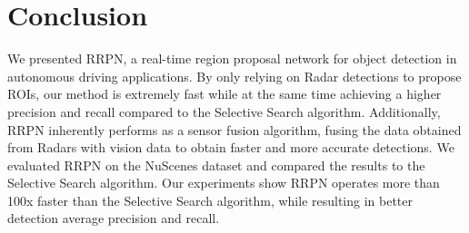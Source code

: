 \documentclass{article}
\newcommand{\dataset}{NuScenes }
\begin{document}
\section{Conclusion}
\label{sec:conclusion}
We presented RRPN, a real-time region proposal network for object 
detection in autonomous driving applications. By only relying on Radar detections to 
propose ROIs, our method is extremely fast while at the same time achieving a higher 
precision and recall compared to the Selective Search algorithm. Additionally, RRPN 
inherently performs as a sensor fusion algorithm, fusing the data obtained 
from Radars with vision data to obtain faster and more accurate detections.
We evaluated RRPN on the \dataset dataset and compared the 
results to the Selective Search algorithm. Our experiments show RRPN operates more 
than 100x faster than the Selective Search algorithm, while resulting 
in better detection average precision and recall.



\end{document}
